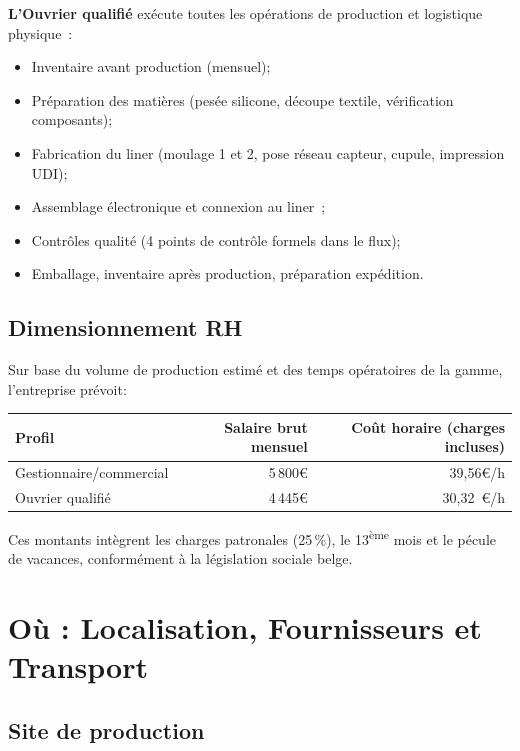 \textbf{L'Ouvrier qualifié} exécute toutes les opérations de production et logistique physique~:
\begin{itemize}
  \item Inventaire avant production (mensuel);
  \item Préparation des matières (pesée silicone, découpe textile, vérification composants);
  \item Fabrication du liner (moulage 1 et 2, pose réseau capteur, cupule, impression UDI);
  \item Assemblage électronique et connexion au liner~;
  \item Contrôles qualité (4 points de contrôle formels dans le flux);
  \item Emballage, inventaire après production, préparation expédition.
\end{itemize}

\subsection{Dimensionnement RH}

Sur base du volume de production estimé et des temps opératoires de la gamme, l'entreprise prévoit:

\vspace{0.5em}
\begin{center}
\begin{tabular}{lrr}
  \toprule
  \textbf{Profil} & \textbf{Salaire brut mensuel} & \textbf{Coût horaire (charges incluses)} \\
  \midrule
  Gestionnaire/commercial & 5\,800\euro{} & 39,56\euro{}/h \\
  Ouvrier qualifié  & 4\,445\euro{} & 30,32~\euro{}/h \\
  \bottomrule
\end{tabular}
\end{center}
\vspace{0.5em}

Ces montants intègrent les charges patronales (25\,\%), le 13\textsuperscript{ème} mois et le pécule
de vacances, conformément à la législation sociale belge.

\section{Où : Localisation, Fournisseurs et Transport}

\subsection{Site de production}

